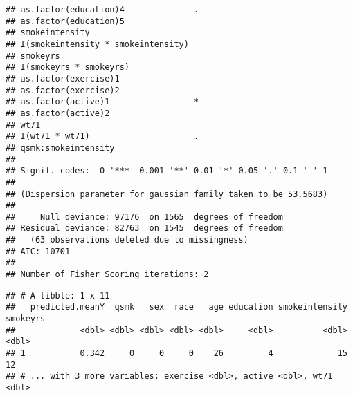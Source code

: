 \documentclass[10pt,]{book}
\newenvironment{Shaded}{\begin{snugshade}}{\end{snugshade}}
\newcommand{\DecValTok}[1]{\textcolor[rgb]{0.00,0.00,0.81}{#1}}
\newcommand{\KeywordTok}[1]{\textcolor[rgb]{0.13,0.29,0.53}{\textbf{#1}}}
\newcommand{\NormalTok}[1]{#1}
\newcommand{\OperatorTok}[1]{\textcolor[rgb]{0.81,0.36,0.00}{\textbf{#1}}}
\newcommand{\StringTok}[1]{\textcolor[rgb]{0.31,0.60,0.02}{#1}}
\begin{document}
\begin{verbatim}
## as.factor(education)4              .  
## as.factor(education)5                 
## smokeintensity                        
## I(smokeintensity * smokeintensity)    
## smokeyrs                              
## I(smokeyrs * smokeyrs)                
## as.factor(exercise)1                  
## as.factor(exercise)2                  
## as.factor(active)1                 *  
## as.factor(active)2                    
## wt71                                  
## I(wt71 * wt71)                     .  
## qsmk:smokeintensity                   
## ---
## Signif. codes:  0 '***' 0.001 '**' 0.01 '*' 0.05 '.' 0.1 ' ' 1
## 
## (Dispersion parameter for gaussian family taken to be 53.5683)
## 
##     Null deviance: 97176  on 1565  degrees of freedom
## Residual deviance: 82763  on 1545  degrees of freedom
##   (63 observations deleted due to missingness)
## AIC: 10701
## 
## Number of Fisher Scoring iterations: 2
\end{verbatim}

\begin{Shaded}
\end{Shaded}

\begin{verbatim}
## # A tibble: 1 x 11
##   predicted.meanY  qsmk   sex  race   age education smokeintensity smokeyrs
##             <dbl> <dbl> <dbl> <dbl> <dbl>     <dbl>          <dbl>    <dbl>
## 1           0.342     0     0     0    26         4             15       12
## # ... with 3 more variables: exercise <dbl>, active <dbl>, wt71 <dbl>
\end{verbatim}

\begin{Shaded}
\end{Shaded}
\end{document}
